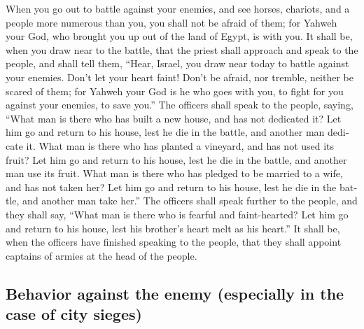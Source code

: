 \begin{paracol}{2}
\begin{otherlanguage}{english}
 When you go out to battle against your enemies, and see
horses, chariots, and a people more numerous than you, you shall not be
afraid of them; for Yahweh your God, who brought you up out of the land
of Egypt, is with you.  It shall be, when you draw near to
the battle, that the priest shall approach and speak to the people,
 and shall tell them, ``Hear, Israel, you draw near today
to battle against your enemies. Don't let your heart faint! Don't be
afraid, nor tremble, neither be scared of them;  for
Yahweh your God is he who goes with you, to fight for you against your
enemies, to save you.''  The officers shall speak to the
people, saying, ``What man is there who has built a new house, and has
not dedicated it? Let him go and return to his house, lest he die in the
battle, and another man dedicate it.  What man is there
who has planted a vineyard, and has not used its fruit? Let him go and
return to his house, lest he die in the battle, and another man use its
fruit.  What man is there who has pledged to be married to
a wife, and has not taken her? Let him go and return to his house, lest
he die in the battle, and another man take her.''  The
officers shall speak further to the people, and they shall say, ``What
man is there who is fearful and faint-hearted? Let him go and return to
his house, lest his brother's heart melt as his heart.'' 
It shall be, when the officers have finished speaking to the people,
that they shall appoint captains of armies at the head of the people.

\hypertarget{behavior-against-the-enemy-especially-in-the-case-of-city-sieges}{%
\subsection{Behavior against the enemy (especially in the case of city
sieges)}\label{behavior-against-the-enemy-especially-in-the-case-of-city-sieges}}


\end{otherlanguage}
\end{paracol}
